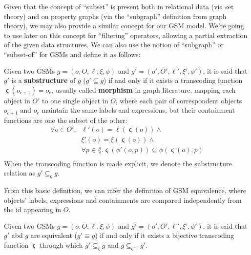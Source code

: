 Given that the concept of ``subset'' is present both in relational data (via set theory) and on property graphs (via the ``subgraph'' definition from graph theory), we may also provide a similar concept for our GSM model. We're going to use later on this concept for ``filtering'' operators, allowing a partial extraction of the given data structures. We can also use the notion of ``subgraph'' or ``subset-of'' for GSMs and define it as follows:
\begin{definition}[Substructure]
Given two GSMs $g=(o,O,\ell,\xi,\phi)$ and $g'=(o',O',\ell',\xi',\phi')$, it is said that $g'$ is a \textbf{substructure} of $g$ ($g'\subseteq g$) if and only if it
 exists a transcoding function $\stigma(o_{c+1})=o_c$, usually called \textbf{morphism} in graph literature, mapping each object in $O'$ to one single object in $O$, where each pair of correspondent objects $o_{c+1}$ and $o_c$ maintain the same labels and expressions, but their containment functions are one the subset of the other:
\[\begin{split}
\forall o\in O'. &\ell'(o) = \ell(\stigma(o))\wedge\\
&\xi'(o) = \xi(\stigma(o))\wedge\\
&\forall p\in\lang. \stigma(\phi'(o,p))\subseteq \phi(\stigma(o),p)\\
\end{split}\]
When the transcoding function is made explicit, we denote the substructure relation as $g'\subseteq_\stigma g$.
\end{definition}

From this basic definition, we can infer the definition of GSM equivalence, where objects' labels, expressions and containments are compared independently from the id appearing in $O$.

\begin{definition}
	Given two GSMs $g=(o,O,\ell,\xi,\phi)$ and $g'=(o',O',\ell',\xi',\phi')$, it is said that $g'$ abd $g$ are equivalent ($g'\equiv g$) if and only if it
	exists a bijective transcoding function $\stigma$ through which $g'\subseteq_\stigma g$ and $g\subseteq_{\stigma^{-1}}g'$.
\end{definition}

